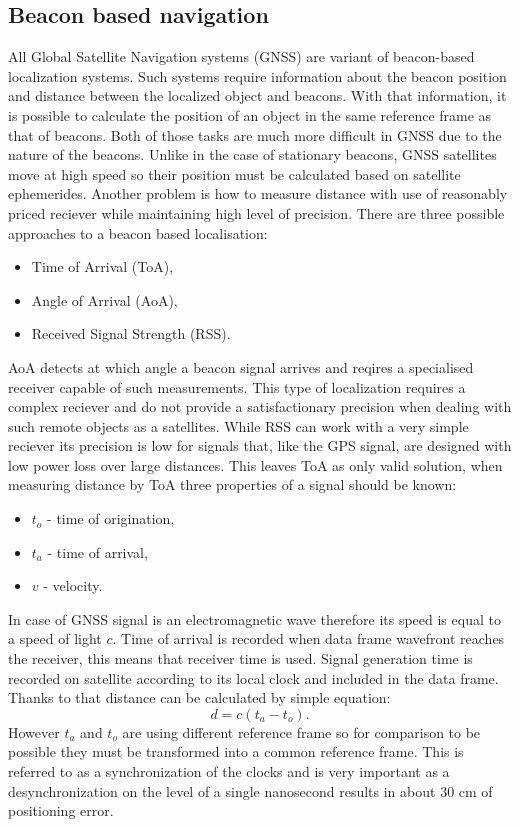 \subsection{Beacon based navigation}
All Global Satellite Navigation systems (GNSS) are variant of beacon-based localization
systems\cite{Blewitt1997}. Such systems require information about the beacon position
and distance between the localized object and beacons.
With that information, it is possible to calculate the position of an object in the same reference
frame as that of beacons.
Both of those tasks are much more difficult in GNSS due to the nature of the beacons.
Unlike in the case of stationary beacons, GNSS satellites move at high speed so
their position must be calculated based on satellite ephemerides.
Another problem is how to measure distance with use of reasonably priced reciever while 
maintaining high level of precision.
There are three possible approaches to a beacon based localisation:
\begin{itemize}
	\item Time of Arrival (ToA),
	\item Angle of Arrival (AoA),
	\item Received Signal Strength (RSS).
\end{itemize}
AoA detects at which angle a beacon signal arrives and reqires a specialised receiver capable 
of such measurements. This type of localization requires a complex reciever and do not provide 
a satisfactionary precision when dealing with such remote objects as a satellites.
While RSS can work with a very simple reciever its precision is low for signals that, like
the GPS signal, are designed with low power loss over large distances.
This leaves ToA as only valid solution, when measuring distance by ToA 
three properties of a signal should be known:
\begin{itemize}
	\item $t_o$ - time of origination,
	\item $t_a$ - time of arrival,
	\item $v$ - velocity.
\end{itemize}
In case of GNSS signal is an electromagnetic wave therefore its speed is equal
to a speed of light $c$. Time of arrival is recorded when
data frame wavefront reaches the receiver, this means that receiver time is used.
Signal generation time is recorded on satellite according to its local clock and
included in the data frame. Thanks to that distance can be calculated by simple
equation:
\begin{equation}
	d=c(t_a-t_o).
\end{equation}
However $t_a$ and $t_o$ are using different reference frame so for comparison
to be possible they must be transformed into a common reference frame.
This is referred to as a synchronization of the clocks and is very important as
a desynchronization on the level of a single nanosecond results in about 30 cm of
positioning error\cite{Enge2011}.

